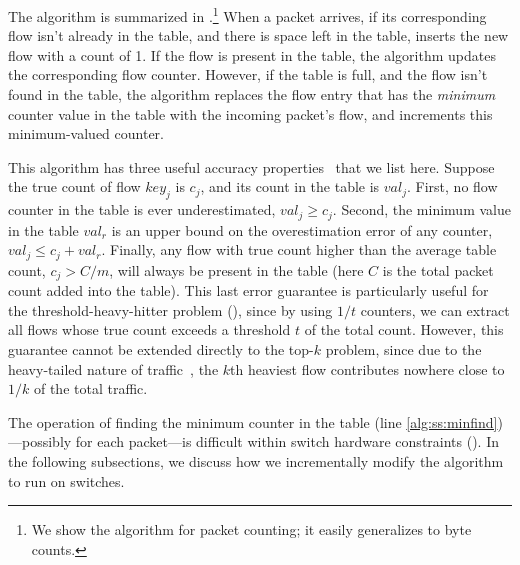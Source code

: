 The algorithm is summarized in .\footnote{We show the algorithm
  for packet counting; it easily generalizes to byte counts.}
%
When a packet arrives, if its corresponding flow isn't already in the table, and
there is space left in the table, \spacesaving inserts the new flow with a count
of 1. If the flow is present in the table, the algorithm updates the
corresponding flow counter. However, if the table is full, and the flow isn't
found in the table, the algorithm replaces the flow entry that has the {\em
  minimum} counter value in the table with the incoming packet's flow, and
increments this minimum-valued counter.

This algorithm has three useful accuracy properties~\cite{metwally2005efficient}
that we list here. Suppose the true count of flow $key_j$ is $c_j$, and its
count in the table is $val_j$. First, no flow counter in the table is ever
underestimated, \ie $val_j \geq c_j$.
Second, the minimum value in the table $val_r$ is an upper bound on the
overestimation error of any counter, \ie $val_j \leq c_j + val_r$.
Finally, any flow with true count higher than the average table count, \ie $c_j
> C/m$, will always be present in the table (here $C$ is the total packet count
added into the table). This last error guarantee is particularly useful for the
threshold-heavy-hitter problem (), since by using $1/t$
counters, we can extract all flows whose true count exceeds a threshold $t$ of
the total count. However, this guarantee cannot be extended directly to the
top-$k$ problem, since due to the heavy-tailed nature of
traffic~\cite{estan2002new}, the $k$th heaviest flow contributes nowhere close
to $1/k$ of the total traffic.

The operation of finding the minimum counter in the table (line
\ref{alg:ss:minfind})---possibly for each packet---is difficult within switch
hardware constraints ().
%
In the following subsections, we discuss how we incrementally modify the
\spacesaving algorithm to run on switches.


